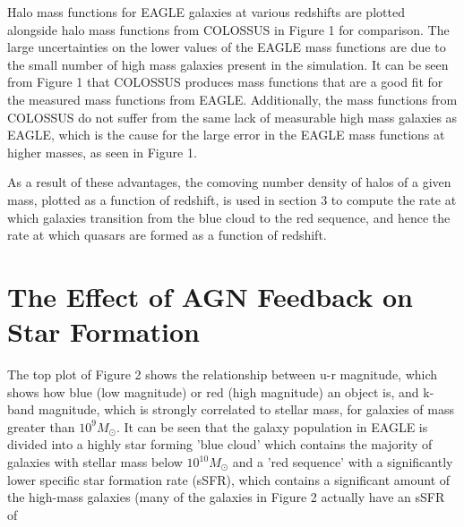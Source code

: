 \documentclass[12pt, twocolumn]{article}%
\begin{document}
Halo mass functions for EAGLE galaxies at various redshifts are plotted alongside halo mass functions from COLOSSUS in Figure 1 for comparison. The large uncertainties on the lower values of the EAGLE mass functions are due to the small number of high mass galaxies present in the simulation. It can be seen from Figure 1 that COLOSSUS produces mass functions that are a good fit for the measured mass functions from EAGLE. Additionally, the mass functions from COLOSSUS do not suffer from the same lack of measurable high mass galaxies as EAGLE, which is the cause for the large error in the EAGLE mass functions at higher masses, as seen in Figure 1.\par

As a result of these advantages, the comoving number density of halos of a given mass, plotted as a function of redshift, is used in section 3 to compute the rate at which galaxies transition from the blue cloud to the red sequence, and hence the rate at which quasars are formed as a function of redshift.

\section{The Effect of AGN Feedback on Star Formation}

The top plot of Figure 2 shows the relationship between u-r magnitude, which shows how blue (low magnitude) or red (high magnitude) an object is, and k-band magnitude, which is strongly correlated to stellar mass, for galaxies of mass greater than $10^9M_\odot$. It can be seen that the galaxy population in EAGLE is divided into a highly star forming 'blue cloud' which contains the majority of galaxies with stellar mass below $10^{10}M_\odot$ and a 'red sequence' with a significantly lower specific star formation rate (sSFR), which contains a significant amount of the high-mass galaxies (many of the galaxies in Figure 2 actually have an sSFR of

\onecolumngrid
\end{document}
